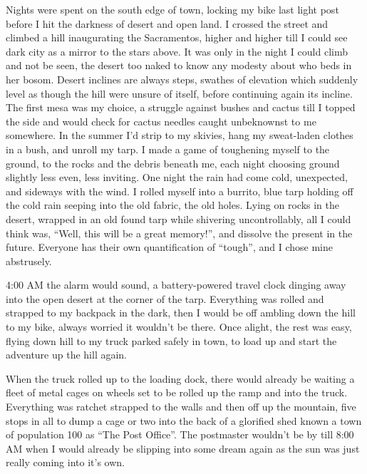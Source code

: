 \documentclass[ebook, 10pt, openright, onecolumn]{memoir}
\begin{document}
Nights were spent on the south edge of town, locking my bike last light post
before I hit the darkness of desert and open land.  I crossed the street and
climbed a hill inaugurating the Sacramentos, higher and higher till I could see
dark city as a mirror to the stars above.  It was only in the night I could
climb and not be seen, the desert too naked to know any modesty about who beds
in her bosom.  Desert inclines are always steps, swathes of elevation which
suddenly level as though the hill were unsure of itself, before continuing again
its incline.  The first mesa was my choice, a struggle against bushes and cactus
till I topped the side and would check for cactus needles caught unbeknownst to
me somewhere.  In the summer I'd strip to my skivies, hang my sweat-laden
clothes in a bush, and unroll my tarp.  I made a game of toughening myself to
the ground, to the rocks and the debris beneath me, each night choosing ground
slightly less even, less inviting.  One night the rain had come cold,
unexpected, and sideways with the wind.  I rolled myself into a burrito, blue
tarp holding off the cold rain seeping into the old fabric, the old holes.
Lying on rocks in the desert, wrapped in an old found tarp while shivering
uncontrollably, all I could think was, ``Well, this will be a great memory!'',
and dissolve the present in the future.  Everyone has their own quantification
of ``tough'', and I chose mine abstrusely.

4:00 AM the alarm would sound, a battery-powered travel clock dinging away into
the open desert at the corner of the tarp.  Everything was rolled and strapped
to my backpack in the dark, then I would be off ambling down the hill to my
bike, always worried it wouldn't be there.  Once alight, the rest was easy,
flying down hill to my truck parked safely in town, to load up and start the
adventure up the hill again.

When the truck rolled up to the loading dock, there would already be waiting a
fleet of metal cages on wheels set to be rolled up the ramp and into the truck.
Everything was ratchet strapped to the walls and then off up the mountain, five
stops in all to dump a cage or two into the back of a glorified shed known a
town of population 100 as ``The Post Office''.  The postmaster wouldn't be by
till 8:00 AM when I would already be slipping into some dream again as the sun
was just really coming into it's own.
\end{document}
